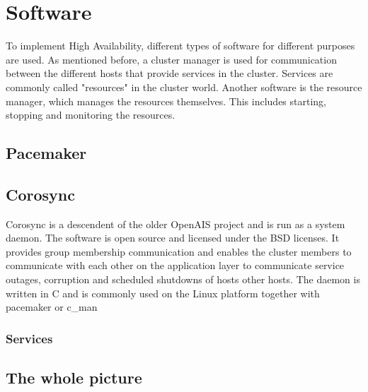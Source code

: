 \section{Software}
To implement High Availability, different types of software for different purposes are used.
As mentioned before, a cluster manager is used for communication between the different hosts that
provide services in the cluster. Services are commonly called "resources" in the cluster world.
Another software is the resource manager, which manages the resources themselves.
This includes starting, stopping and monitoring the resources.
\subsection{Pacemaker}
\subsubsection{}
\subsection{Corosync}
Corosync is a descendent of the older OpenAIS project and is run as a system daemon. The software is open source and licensed under the BSD licenses. It provides group membership communication and enables the cluster members to communicate with each other on the application layer to communicate service outages, corruption and scheduled shutdowns of hosts other hosts. The daemon is written in C and is commonly used on the Linux platform together with pacemaker or c_man
\subsubsection{Services}

\subsection{The whole picture}